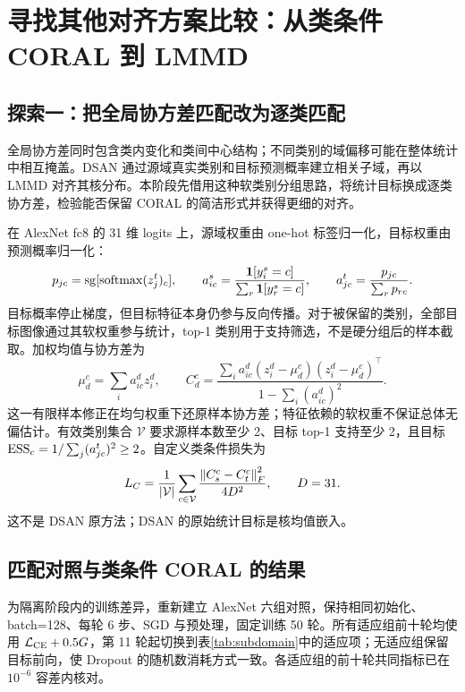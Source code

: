 \section{寻找其他对齐方案比较：从类条件 CORAL 到 LMMD}
\label{sec:alternatives}

\subsection{探索一：把全局协方差匹配改为逐类匹配}

全局协方差同时包含类内变化和类间中心结构；不同类别的域偏移可能在整体统计中相互掩盖。DSAN 通过源域真实类别和目标预测概率建立相关子域，再以 LMMD 对齐其核分布\cite{zhu2021dsan}。本阶段先借用这种软类别分组思路，将统计目标换成逐类协方差，检验能否保留 CORAL 的简洁形式并获得更细的对齐。

在 AlexNet fc8 的 31 维 logits 上，源域权重由 one-hot 标签归一化，目标权重由预测概率归一化：
\begin{equation*}
 p_{jc}=\operatorname{sg}[\operatorname{softmax}(z_j^t)_c],\qquad
 a^s_{ic}=\frac{\mathbf1[y_i^s=c]}{\sum_r\mathbf1[y_r^s=c]},\qquad
 a^t_{jc}=\frac{p_{jc}}{\sum_rp_{rc}}.
\end{equation*}
目标概率停止梯度，但目标特征本身仍参与反向传播。对于被保留的类别，全部目标图像通过其软权重参与统计，top-1 类别用于支持筛选，不是硬分组后的样本截取。加权均值与协方差为
\begin{equation*}
 \mu_d^c=\sum_i a^d_{ic}z_i^d,\qquad
 C_d^c=\frac{\sum_i a^d_{ic}(z_i^d-\mu_d^c)(z_i^d-\mu_d^c)^\top}
 {1-\sum_i(a^d_{ic})^2}.
\end{equation*}
这一有限样本修正在均匀权重下还原样本协方差；特征依赖的软权重不保证总体无偏估计。有效类别集合 $\mathcal V$ 要求源样本数至少 2、目标 top-1 支持至少 2，且目标 $\operatorname{ESS}_c=1/\sum_j(a^t_{jc})^2\ge2$。自定义类条件损失为
\begin{equation*}
 L_C=\frac1{|\mathcal V|}\sum_{c\in\mathcal V}
 \frac{\left\lVert C_s^c-C_t^c\right\rVert_F^2}{4D^2},\qquad D=31.
 \label{eq:local}
\end{equation*}
这不是 DSAN 原方法；DSAN 的原始统计目标是核均值嵌入。

\subsection{匹配对照与类条件 CORAL 的结果}

为隔离阶段内的训练差异，重新建立 AlexNet 六组对照，保持相同初始化、batch=128、每轮 6 步、SGD 与预处理，固定训练 50 轮。所有适应组前十轮均使用 $\mathcal L_{\mathrm{CE}}+0.5G$，第 11 轮起切换到表\ref{tab:subdomain}中的适应项；无适应组保留目标前向，使 Dropout 的随机数消耗方式一致。各适应组的前十轮共同指标已在 $10^{-6}$ 容差内核对。

